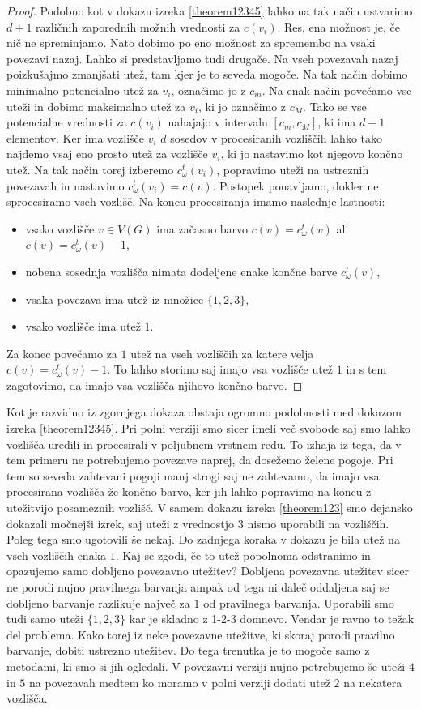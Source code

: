 \documentclass[12pt,a4paper,twoside]{article}
\theoremstyle{definition} %
\theoremstyle{plain} %
\numberwithin{equation}{section}  %
\begin{document}
\begin{proof}
Podobno kot v dokazu izreka \ref{theorem12345} lahko na tak način ustvarimo $d+1$ različnih zaporednih možnih vrednosti za $c(v_i)$. Res, ena možnost je, če nič ne spreminjamo. Nato dobimo po eno možnost za spremembo na vsaki povezavi nazaj. Lahko si predstavljamo tudi drugače. Na vseh povezavah nazaj poizkušajmo zmanjšati utež, tam kjer je to seveda mogoče. Na tak način dobimo minimalno potencialno utež za $v_i$, označimo jo z  $c_m$. Na enak način povečamo vse uteži in dobimo maksimalno utež za $v_i$, ki jo označimo z $c_M$. Tako se vse potencialne vrednosti za $c(v_i)$ nahajajo v intervalu $[c_m, c_M]$, ki ima $d+1$ elementov. Ker ima vozlišče $v_i$ $d$ sosedov v procesiranih vozliščih lahko tako najdemo vsaj eno prosto utež za vozlišče $v_i$, ki jo nastavimo kot njegovo končno utež. Na tak način torej izberemo $c_{\omega}^t(v_i)$, popravimo uteži na ustreznih povezavah in nastavimo $c_{\omega}^t(v_i) = c(v)$. Postopek ponavljamo, dokler ne sprocesiramo vseh vozlišč. Na koncu procesiranja imamo naslednje lastnosti:
\begin{itemize}
\item vsako vozlišče $v \in V(G)$ ima začasno barvo $c(v) = c_{\omega}^t(v)$ ali $c(v) = c_{\omega}^t(v) - 1$,
\item nobena sosednja vozlišča nimata dodeljene enake končne barve $c_{\omega}^t(v)$,
\item vsaka povezava ima utež iz množice $\{1,2,3\}$,
\item vsako vozlišče ima utež $1$.
\end{itemize}
Za konec povečamo za $1$ utež na vseh vozliščih za katere velja $c(v) = c_{\omega}^t(v) - 1$. To lahko storimo saj imajo vsa vozlišče utež $1$ in s tem zagotovimo, da imajo vsa vozlišča njihovo končno barvo.

\end{proof}
Kot je razvidno iz zgornjega dokaza obstaja ogromno podobnosti med dokazom izreka \ref{theorem12345}. Pri polni verziji smo sicer imeli več svobode saj smo lahko vozlišča uredili in procesirali v poljubnem vrstnem redu. To izhaja iz tega, da v tem primeru ne potrebujemo povezave naprej, da dosežemo želene pogoje. Pri tem so seveda zahtevani pogoji manj strogi saj ne zahtevamo, da imajo vsa procesirana vozlišča že končno barvo, ker jih lahko popravimo na koncu z utežitvijo posameznih vozlišč. V samem dokazu izreka \ref{theorem123} smo dejansko dokazali močnejši izrek, saj uteži z vrednostjo $3$ nismo uporabili na vozliščih. Poleg tega smo ugotovili še nekaj. Do zadnjega koraka v dokazu je bila utež na vseh vozliščih enaka $1$. Kaj se zgodi, če to utež popolnoma odstranimo in opazujemo samo dobljeno povezavno utežitev? Dobljena povezavna utežitev sicer ne porodi nujno pravilnega barvanja ampak od tega ni daleč oddaljena saj se dobljeno barvanje razlikuje največ za $1$ od pravilnega barvanja. Uporabili smo tudi samo uteži $\{1,2,3\}$ kar je skladno z 1-2-3 domnevo. Vendar je ravno to težak del problema. Kako torej iz neke povezavne utežitve, ki skoraj porodi pravilno barvanje, dobiti ustrezno utežitev. Do tega trenutka je to mogoče samo z metodami, ki smo si jih ogledali. V povezavni verziji nujno potrebujemo še uteži $4$ in $5$ na povezavah medtem ko moramo v polni verziji dodati utež $2$ na nekatera vozlišča.
\end{document}
